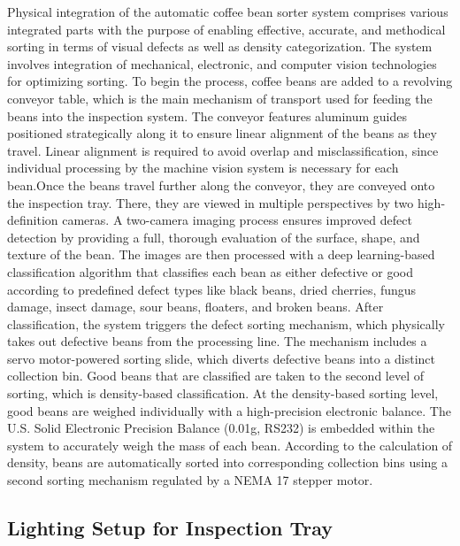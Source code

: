 Physical integration of the automatic coffee bean sorter system comprises various integrated parts with the purpose of enabling effective, accurate, and methodical sorting in terms of visual defects as well as density categorization. The system involves integration of mechanical, electronic, and computer vision technologies for optimizing sorting. To begin the process, coffee beans are added to a revolving conveyor table, which is the main mechanism of transport used for feeding the beans into the inspection system. The conveyor features aluminum guides positioned strategically along it to ensure linear alignment of the beans as they travel. Linear alignment is required to avoid overlap and misclassification, since individual processing by the machine vision system is necessary for each bean.Once the beans travel further along the conveyor, they are conveyed onto the inspection tray. There, they are viewed in multiple perspectives by two high-definition cameras. A two-camera imaging process ensures improved defect detection by providing a full, thorough evaluation of the surface, shape, and texture of the bean. The images are then processed with a deep learning-based classification algorithm that classifies each bean as either defective or good according to predefined defect types like black beans, dried cherries, fungus damage, insect damage, sour beans, floaters, and broken beans. After classification, the system triggers the defect sorting mechanism, which physically takes out defective beans from the processing line. The mechanism includes a servo motor-powered sorting slide, which diverts defective beans into a distinct collection bin. Good beans that are classified are taken to the second level of sorting, which is density-based classification. At the density-based sorting level, good beans are weighed individually with a high-precision electronic balance. The U.S. Solid Electronic Precision Balance (0.01g, RS232) is embedded within the system to accurately weigh the mass of each bean. According to the calculation of density, beans are automatically sorted into corresponding collection bins using a second sorting mechanism regulated by a NEMA 17 stepper motor.

\subsection{Lighting Setup for Inspection Tray}

